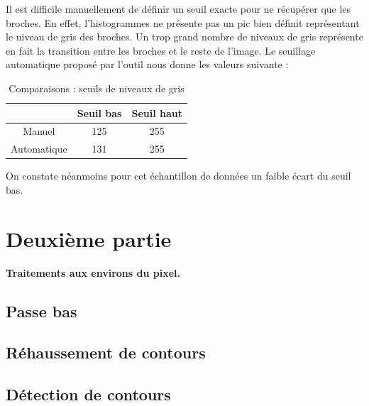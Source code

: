 \documentclass{scrreprt}
\begin{document}
\newpage
Il est difficile manuellement de définir un seuil exacte pour ne récupérer que les broches.
En effet, l'histogrammes ne présente pas un pic bien définit représentant le niveau de gris 
des broches. Un trop grand nombre de niveaux de gris représente en fait la transition entre
les broches et le reste de l'image. Le seuillage automatique proposé par l'outil nous donne 
les valeurs suivante : 

\begin{table}[H]
        \begin{center}
                \begin{tabular}{|c|c|c|}
                   \hline
                   & Seuil bas & Seuil haut \\
                   \hline
                   Manuel & 125 & 255\\
                   \hline
                   Automatique & 131 & 255\\
                   \hline
                \end{tabular}
        \end{center}
        \caption{Comparaisons : seuils de niveaux de gris}
\end{table} 

On constate néanmoins pour cet échantillon de données un faible écart du seuil bas.

\chapter{Deuxième partie}

\begin{center}
\large{
\textbf{Traitements aux environs du pixel.}}
\end{center}

\section{Passe bas}

\section{Réhaussement de contours}



\newpage
\section{Détection de contours}
\end{document}
